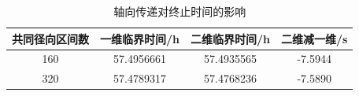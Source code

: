 \begin{table}[H]
    \centering
    \small
    \renewcommand{\arraystretch}{0.82}

    \caption{轴向传递对终止时间的影响}
    \label{tab:q3_dimension}

    \begin{tabular*}{0.78\textwidth}
        {@{\extracolsep{\fill}}cccc@{}}
        \toprule
        共同径向区间数 & 一维临界时间/h & 二维临界时间/h & 二维减一维/s \\
        \midrule
        160 & 57.4956661 & 57.4935565 & -7.5944 \\
        320 & 57.4789317 & 57.4768236 & -7.5890 \\
        \bottomrule
    \end{tabular*}
\end{table}
